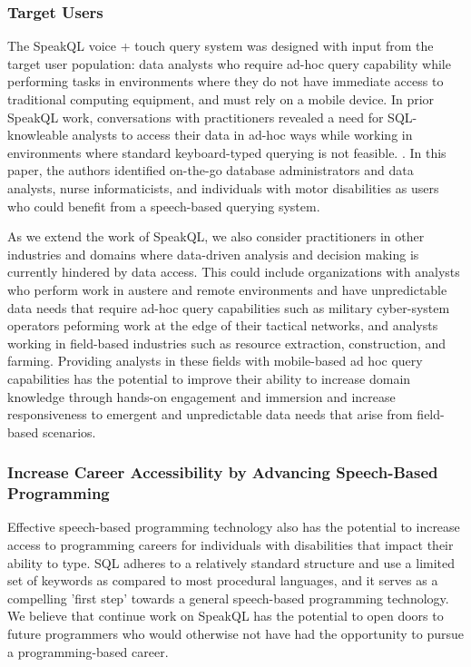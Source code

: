 \subsubsection{Target Users}

The SpeakQL voice + touch query system was designed with input from the target user population: data analysts who require ad-hoc query capability while performing tasks in environments where they do not have immediate access to traditional computing equipment, and must rely on a mobile device. In prior SpeakQL work, conversations with practitioners revealed a need for SQL-knowleable analysts to access their data in ad-hoc ways while working in environments where standard keyboard-typed querying is not feasible. \cite{Shah2020}. In this paper, the authors identified on-the-go database administrators and data analysts, nurse informaticists, and individuals with motor disabilities as users who could benefit from a speech-based querying system. 

As we extend the work of SpeakQL, we also consider practitioners in other industries and domains where data-driven analysis and decision making is currently hindered by data access. This could include organizations with analysts who perform work in austere and remote environments and have unpredictable data needs that require ad-hoc query capabilities such as military cyber-system operators peforming work at the edge of their tactical networks, and analysts working in field-based industries such as resource extraction, construction, and farming. Providing analysts in these fields with mobile-based ad hoc query capabilities has the potential to improve their ability to increase domain knowledge through hands-on engagement and immersion and increase responsiveness to emergent and unpredictable data needs that arise from field-based scenarios.

\subsubsection{Increase Career Accessibility by Advancing Speech-Based Programming}

Effective speech-based programming technology also has the potential to increase access to programming careers for individuals with disabilities that impact their ability to type. SQL adheres to a relatively standard structure and use a limited set of keywords as compared to most procedural languages, and it serves as a compelling 'first step' towards a general speech-based programming technology. We believe that continue work on SpeakQL has the potential to open doors to future programmers who would otherwise not have had the opportunity to pursue a programming-based career.

